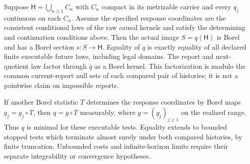 \begin{theorem}\label{thm:quotient}
Suppose $\mathsf H=\bigcup_{n\ge1}C_n$ with $C_n$ compact in its metrizable carrier and every $q_j$ continuous on each $C_n$. Assume the specified response coordinates are the consistent conditional laws of the raw causal kernels and satisfy the determining and continuation conditions above. Then the actual image $S=q(\mathsf H)$ is Borel and has a Borel section $s:S\to\mathsf H$. Equality of $q$ is exactly equality of all declared finite executable future laws, including legal domains. The report and next-quotient law factor through $q$ as a Borel kernel. This factorization is modulo the common current-report null sets of each compared pair of histories; it is not a pointwise claim on impossible reports.

If another Borel statistic $T$ determines the response coordinates by Borel maps $q_j=g_j\circ T$, then $q=g\circ T$ measurably, where $g=(g_j)_{j\ge1}$ on the realized range. Thus $q$ is minimal for these executable tests. Equality extends to bounded stopped tests which terminate almost surely under both compared histories, by finite truncation. Unbounded costs and infinite-horizon limits require their separate integrability or convergence hypotheses.
\end{theorem}
